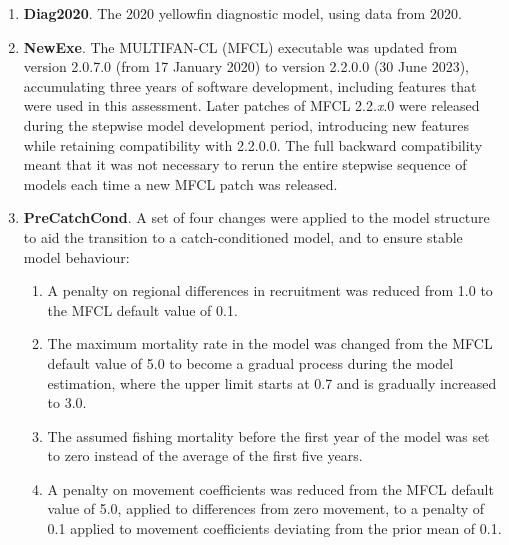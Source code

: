 \begin{enumerate}

  \item \textbf{Diag2020}. The 2020 yellowfin diagnostic model, using data from 2020.

  \item \textbf{NewExe}. The MULTIFAN-CL (MFCL) executable was updated from version 2.0.7.0 (from 17 January 2020) to version 2.2.0.0 (30 June 2023), accumulating three years of software development, including features that were used in this assessment. Later patches of MFCL 2.2.\emph{x}.0 were released during the stepwise model development period, introducing new features while retaining compatibility with 2.2.0.0. The full backward compatibility meant that it was not necessary to rerun the entire stepwise sequence of models each time a new MFCL patch was released.

  \item \textbf{PreCatchCond}. A set of four changes were applied to the model structure to aid the transition to a catch-conditioned model, and to ensure stable model behaviour:
  \begin{enumerate}
    \item A penalty on regional differences in recruitment was reduced from 1.0 to the MFCL default value of 0.1.
    \item The maximum mortality rate in the model was changed from the MFCL default value of 5.0 to become a gradual process during the model estimation, where the upper limit starts at 0.7 and is gradually increased to 3.0.
    \item The assumed fishing mortality before the first year of the model was set to zero instead of the average of the first five years.
    \item A penalty on movement coefficients was reduced from the MFCL default value of 5.0, applied to differences from zero movement, to a penalty of 0.1 applied to movement coefficients deviating from the prior mean of 0.1.
  \end{enumerate}


\end{enumerate}
